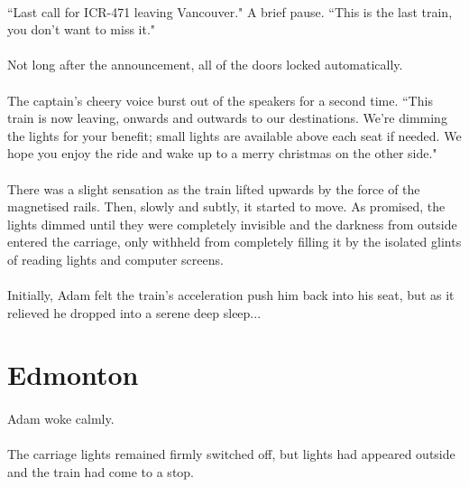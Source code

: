 \documentclass{article}
\begin{document}
\paragraph{}
``Last call for ICR-471 leaving Vancouver." A brief pause. ``This is the last train, you don't want to miss it."

\paragraph{}
Not long after the announcement, all of the doors locked automatically.

\paragraph{}
The captain's cheery voice burst out of the speakers for a second time. ``This train is now leaving, onwards and outwards to our destinations. We're dimming the lights for your benefit; small lights are available above each seat if needed. We hope you enjoy the ride and wake up to a merry christmas on the other side."

\paragraph{}
There was a slight sensation as the train lifted upwards by the force of the magnetised rails. Then, slowly and subtly, it started to move. As promised, the lights dimmed until they were completely invisible and the darkness from outside entered the carriage, only withheld from completely filling it by the isolated glints of reading lights and computer screens.

\paragraph{}
Initially, Adam felt the train's acceleration push him back into his seat, but as it relieved he dropped into a serene deep sleep...

\section{Edmonton}

\paragraph{}
Adam woke calmly.

\paragraph{}
The carriage lights remained firmly switched off, but lights had appeared outside and the train had come to a stop.
\end{document}
